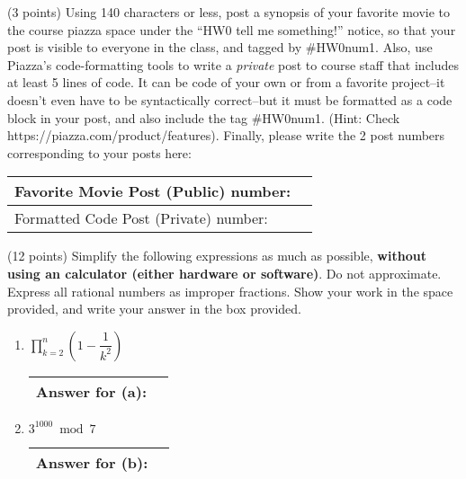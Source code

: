 \documentclass[11pt]{article}
\begin{document}
\newpage
\begin{problems}
\item (3 points) Using 140 characters or less, post a synopsis of your favorite movie to the course piazza space under the ``HW0 tell me something!'' notice, so that your post is visible to everyone in the class, and tagged by \#HW0num1.  Also, use Piazza's code-formatting tools to write a {\em private} post to course staff that includes at least 5 lines of code.  It can be code of your own or from a favorite project--it doesn't even have to be syntactically correct--but it must be formatted as a code block in your post, and also include the tag \#HW0num1.  (Hint: Check https://piazza.com/product/features).  Finally, please write the 2 post numbers corresponding to your posts here:

\begin{table}[h]
\hspace{.3in}  
\renewcommand{\arraystretch}{2}
\begin{tabular}{|l|c| }
\hline
Favorite Movie Post (Public) number: & \hspace{2in} \\
\hline
Formatted Code Post (Private)  number: & \hspace{2in}\\ 
\hline
\end{tabular}
\end{table}

\item (12 points)
Simplify the following expressions as much as possible,
\textbf{without using an calculator (either hardware or software)}.
Do not approximate. Express all rational numbers as improper
fractions. Show your work in the space provided, and write your answer in the box provided.
\begin{enumerate}

\item $\displaystyle\prod_{k=2}^n (1-\dfrac{1}{k^2})$ 
\vspace{1.5in} \begin{table}[!h] \flushright \renewcommand{\arraystretch}{2} \begin{tabular}{|l|c| }
\hline
Answer for (a): & \hspace{2in} \\
\hline
\end{tabular} \end{table}

\item $3^{1000} \bmod 7$ 
\vspace{1.5in}
\begin{table}[!h] \flushright \renewcommand{\arraystretch}{2}  \begin{tabular}{|l|c| } \hline
Answer for (b): & \hspace{2in} \\
\hline \end{tabular} \end{table}


\end{enumerate}
\end{problems}
\end{document}
